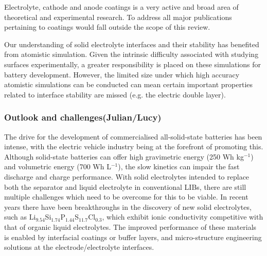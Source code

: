 \documentclass[../main.tex]{subfiles}
\begin{document}
Electrolyte, cathode and anode coatings is a very active and broad area of theoretical and experimental research. To address all major publications pertaining to coatings would fall outside the scope of this review. 

Our understanding of solid electrolyte interfaces and their stability has benefited from atomistic simulation. Given the intrinsic difficulty associated with studying surfaces experimentally, a greater responsibility is placed on these simulations for battery development. However, the limited size under which high accuracy atomistic simulations can be conducted can mean certain important properties related to interface stability are missed (e.g. the electric double layer\cite{Tateyama2019}).

\subsubsection{Outlook and challenges(Julian/Lucy)}
\label{sec:outlook_electrolytes}

The drive for the development of commercialised all-solid-state batteries has been intense, with the electric vehicle industry being at the forefront of promoting this.\cite{Woods_2021} Although solid-state batteries can offer high gravimetric energy (250 Wh kg$^{-1}$) and volumetric energy (700 Wh L$^{-1}$), the slow kinetics can impair the fast discharge and charge performance. With solid electrolytes intended to replace both the separator and liquid electrolyte in conventional LIBs, \cite{schnell2020solid} there are still multiple challenges which need to be overcome for this to be viable. In recent years there have been breakthroughs in the discovery of new solid electrolytes, such as Li$_{9.54}$Si$_{1.74}$P$_{1.44}$S$_{11.7}$Cl$_{0.3}$, \cite{kato2016high} which exhibit ionic conductivity competitive with that of organic liquid electrolytes. The improved performance of these materials is enabled by interfacial coatings or buffer layers, and micro-structure engineering solutions at the electrode/electrolyte interfaces.  \cite{kim2021solid}
\end{document}
